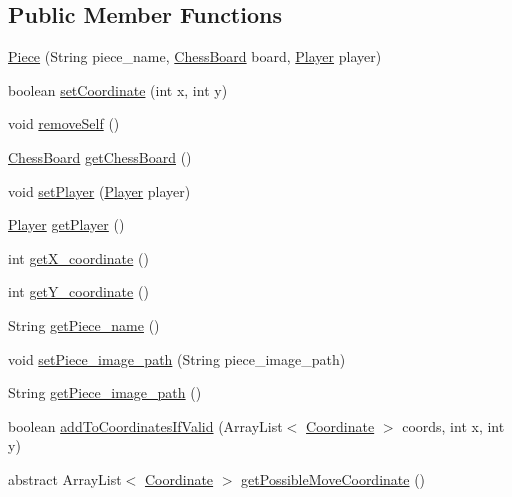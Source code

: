 \subsection*{Public Member Functions}
\begin{DoxyCompactItemize}
\item 
\hyperlink{classpiece_1_1_piece_a2a951c56b9c86a93fab817ddb7da4413}{Piece} (String piece\+\_\+name, \hyperlink{classchess_1_1_chess_board}{Chess\+Board} board, \hyperlink{enumchess_1_1_player}{Player} player)
\item 
boolean \hyperlink{classpiece_1_1_piece_a22f311f1704a5fff7041bf311a88bb80}{set\+Coordinate} (int x, int y)
\item 
void \hyperlink{classpiece_1_1_piece_a2b2074610fdf598443fcc3f0b1a32f13}{remove\+Self} ()
\item 
\hyperlink{classchess_1_1_chess_board}{Chess\+Board} \hyperlink{classpiece_1_1_piece_a1004705760b36db3185de90faaf76bbc}{get\+Chess\+Board} ()
\item 
void \hyperlink{classpiece_1_1_piece_a01948cad1916776f6a900c2918f395c3}{set\+Player} (\hyperlink{enumchess_1_1_player}{Player} player)
\item 
\hyperlink{enumchess_1_1_player}{Player} \hyperlink{classpiece_1_1_piece_ac2f9d5a3cef28997c6bfab69792a2898}{get\+Player} ()
\item 
int \hyperlink{classpiece_1_1_piece_a0b9fa85eb166a0290e7825daddd7d129}{get\+X\+\_\+coordinate} ()
\item 
int \hyperlink{classpiece_1_1_piece_a12a8ca4143a3d3937ad8071d9e29c171}{get\+Y\+\_\+coordinate} ()
\item 
String \hyperlink{classpiece_1_1_piece_afb5b4b2899fb574b421125c12e4adc31}{get\+Piece\+\_\+name} ()
\item 
void \hyperlink{classpiece_1_1_piece_a07277fb8549c95d3522223790bf8a7c5}{set\+Piece\+\_\+image\+\_\+path} (String piece\+\_\+image\+\_\+path)
\item 
String \hyperlink{classpiece_1_1_piece_a0e49c966ed4a5dde90300825502ae4fd}{get\+Piece\+\_\+image\+\_\+path} ()
\item 
boolean \hyperlink{classpiece_1_1_piece_a9e8b91312f7a03a15cc987b5f5a99989}{add\+To\+Coordinates\+If\+Valid} (Array\+List$<$ \hyperlink{classpiece_1_1_coordinate}{Coordinate} $>$ coords, int x, int y)
\item 
abstract Array\+List$<$ \hyperlink{classpiece_1_1_coordinate}{Coordinate} $>$ \hyperlink{classpiece_1_1_piece_a9ac176ed64bf25c3fdbf5668ba4011e4}{get\+Possible\+Move\+Coordinate} ()
\end{DoxyCompactItemize}
